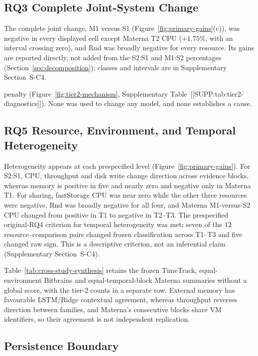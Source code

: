 \subsection{RQ3 Complete Joint-System Change}
\label{sec:results-rq3}

The complete joint change, M1 versus S1 (Figure~\ref{fig:primary-gains}(c)),
was negative in every displayed cell except Materna T2 CPU ($+1.75\%$, with an
interval crossing zero), and Rnd was broadly negative for every resource. Its
gains are reported directly, not added from the S2:S1 and M1:S2 percentages
(Section~\ref{sec:decomposition}); classes and intervals are in Supplementary
Section~S-C4.

penalty (Figure~\ref{fig:tier2-mechanism}, Supplementary
Table~[[SUPP:tab:tier2-diagnostics]]). None was used to change any model, and
none establishes a cause.

\subsection{RQ5 Resource, Environment, and Temporal Heterogeneity}
\label{sec:results-rq4}
\label{sec:cross-dataset-synthesis}

Heterogeneity appears at each prespecified level
(Figure~\ref{fig:primary-gains}). For S2:S1, CPU, throughput and disk write
change direction across evidence blocks, whereas memory is positive in five
and nearly zero and negative only in Materna T1. For sharing, fastStorage CPU
was near zero while the other three resources were negative, Rnd was broadly
negative for all four, and Materna M1-versus-S2 CPU changed from positive in
T1 to negative in T2--T3. The prespecified original-RQ4 criterion for temporal
heterogeneity was met: seven of the 12 resource--comparison pairs changed
frozen classification across T1--T3 and five changed raw sign. This is a
descriptive criterion, not an inferential claim (Supplementary
Section~S-C4).

Table~\ref{tab:cross-study-synthesis} retains the frozen TimeTrack,
equal-environment Bitbrains and equal-temporal-block Materna summaries without
a global score, with the tier-2 counts in a separate row. External memory has
favourable LSTM/Ridge contextual agreement, whereas throughput reverses
direction between families, and Materna's consecutive blocks share VM
identifiers, so their agreement is not independent replication.

\subsection{Persistence Boundary}
\label{sec:results-persistence}

